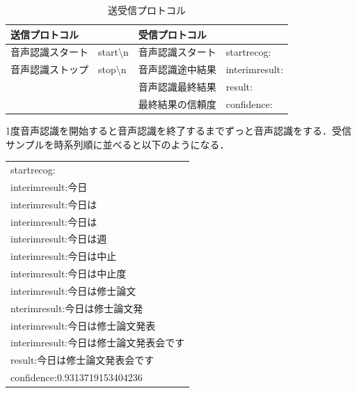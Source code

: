 \begin{table}[hbtp]
    \caption{送受信プロトコル}
    \label{sendrecv}
    \centering
    \begin{tabular}{l|l}
    \hline
    送信プロトコル                         & 受信プロトコル                  \\ \hline
    音声認識スタート　start\textbackslash{}n & 音声認識スタート　startrecog:      \\
    音声認識ストップ　stop\textbackslash{}n  & 音声認識途中結果　interimresult:  \\
                                    & 音声認識最終結果　result:          \\ 
                                    &  最終結果の信頼度　confidence:       \\ \hline
    \end{tabular}
\end{table}

1度音声認識を開始すると音声認識を終了するまでずっと音声認識をする．受信サンプルを時系列順に並べると以下のようになる．
\begin{table}[hbtp]
    \centering
    \begin{tabular}{|l|}
    \hline
    startrecog:\\
    interimresult:今日\\
    interimresult:今日は\\
    interimresult:今日は\\
    interimresult:今日は週\\
    interimresult:今日は中止\\
    interimresult:今日は中止度\\
    interimresult:今日は修士論文\\
    nterimresult:今日は修士論文発\\
    interimresult:今日は修士論文発表\\
    interimresult:今日は修士論文発表会です\\
    result:今日は修士論文発表会です\\
    confidence:0.9313719153404236\\
    \hline
    \end{tabular}
\end{table}

